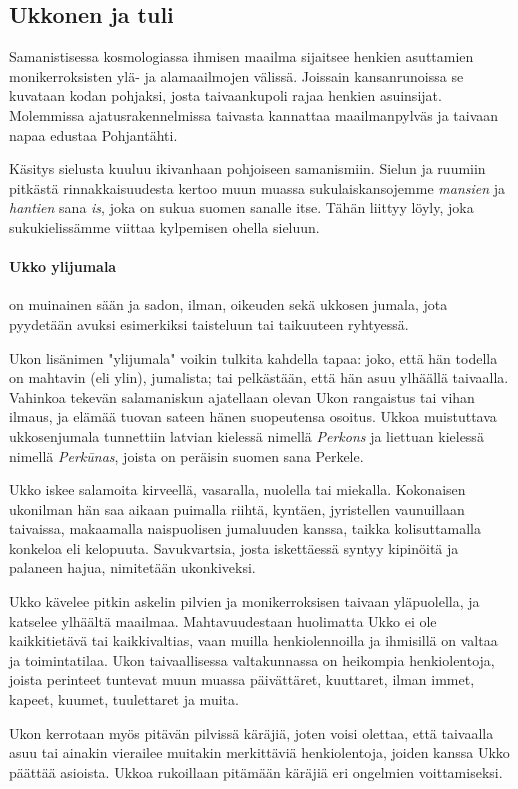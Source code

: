 \subsection{Ukkonen ja tuli}

    Samanistisessa kosmologiassa ihmisen maailma sijaitsee henkien asuttamien monikerroksisten ylä-
    ja alamaailmojen välissä. Joissain kansanrunoissa se kuvataan kodan pohjaksi, josta
    taivaankupoli rajaa henkien asuinsijat. Molemmissa ajatusrakennelmissa taivasta kannattaa
    maailmanpylväs ja taivaan napaa edustaa Pohjantähti.
    \par
    Käsitys sielusta kuuluu ikivanhaan pohjoiseen samanismiin. Sielun ja ruumiin pitkästä
    rinnakkaisuudesta kertoo muun muassa sukulaiskansojemme \emph{mansien} ja \emph{hantien} sana
    \emph{is}, joka on sukua suomen sanalle itse. Tähän liittyy löyly, joka sukukielissämme viittaa
    kylpemisen ohella sieluun.
  \paragraph{Ukko ylijumala} on muinainen sään ja sadon, ilman, oikeuden sekä ukkosen jumala, jota
    pyydetään avuksi esimerkiksi taisteluun tai taikuuteen ryhtyessä.
    \par
    Ukon lisänimen "ylijumala" voikin tulkita kahdella tapaa: joko, että hän todella on mahtavin
    (eli ylin), jumalista; tai pelkästään, että hän asuu ylhäällä taivaalla. Vahinkoa tekevän
    salamaniskun ajatellaan olevan Ukon rangaistus tai vihan ilmaus, ja elämää tuovan sateen
    hänen suopeutensa osoitus. Ukkoa muistuttava ukkosenjumala tunnettiin latvian kielessä nimellä
    \emph{Perkons} ja liettuan kielessä nimellä \emph{Perkūnas}, joista on peräisin suomen sana
    Perkele.
    \par
    Ukko iskee salamoita kirveellä, vasaralla, nuolella tai miekalla. Kokonaisen ukonilman hän saa
    aikaan puimalla riihtä, kyntäen, jyristellen vaunuillaan taivaissa, makaamalla naispuolisen
    jumaluuden kanssa, taikka kolisuttamalla konkeloa eli kelopuuta. Savukvartsia, josta
    iskettäessä syntyy kipinöitä ja palaneen hajua, nimitetään ukonkiveksi.
    \par
    Ukko kävelee pitkin askelin pilvien ja monikerroksisen taivaan yläpuolella, ja katselee
    ylhäältä maailmaa. Mahtavuudestaan huolimatta Ukko ei ole kaikkitietävä tai kaikkivaltias, vaan
    muilla henkiolennoilla ja ihmisillä on valtaa ja toimintatilaa. Ukon taivaallisessa
    valtakunnassa on heikompia henkiolentoja, joista perinteet tuntevat muun muassa päivättäret,
    kuuttaret, ilman immet, kapeet, kuumet, tuulettaret ja muita.
    \par
    Ukon kerrotaan myös pitävän pilvissä käräjiä, joten voisi olettaa, että taivaalla asuu tai
    ainakin vierailee muitakin merkittäviä henkiolentoja, joiden kanssa Ukko päättää asioista.
    Ukkoa rukoillaan pitämään käräjiä eri ongelmien voittamiseksi.

